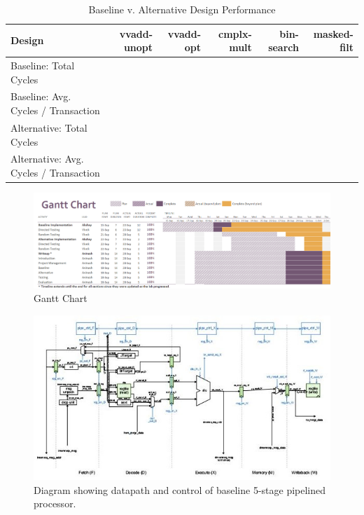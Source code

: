 \documentclass[10pt]{article}
\begin{document}
\begin{center}
\begin{table}[h]
\begin{tabular} {|l | r | r | r | r | r |}

\hline
\textbf{Design}    & \textbf{vvadd-unopt} & \textbf{vvadd-opt} & \textbf{cmplx-mult} & \textbf{bin-search} & \textbf{masked-filt} \\
\hline
Baseline:    Total Cycles                 &        &       &      & 	&						\\
Baseline:    Avg. Cycles / Transaction    &        &       &      & 	&						\\
Alternative: Total Cycles                 &        &       &      & 	&						\\
Alternative: Avg. Cycles / Transaction    &        &       &      & 	&					    \\
\hline                    
\end{tabular}
\caption{Baseline v. Alternative Design Performance}
\label{tab:cycles}
\end{table}
\end{center}

\pagebreak[4]


\begin{figure}[b]
\centering
\includegraphics[scale=0.5, angle=90]{gantt}
\caption{Gantt Chart}
\label{fig:gantt}
\end{figure}



\begin{figure}[b]
\centering
\includegraphics[scale=1.1]{baseline}
\caption{Diagram showing datapath and control of baseline 5-stage pipelined processor.}
\label{fig:baseline}
\end{figure}
\end{document}
